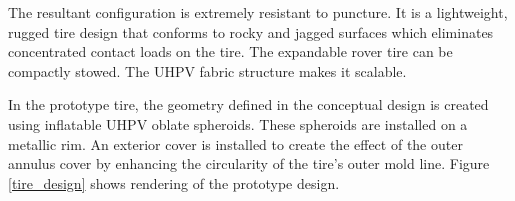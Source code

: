 \documentclass{article}
\begin{document}
The resultant configuration is extremely resistant to puncture. It is a lightweight, rugged tire design that conforms to rocky and jagged surfaces which eliminates concentrated contact loads on the tire. The expandable rover tire can be compactly stowed. The UHPV fabric structure makes it scalable. 

In the prototype tire, the geometry defined in the conceptual design is created using inflatable UHPV oblate spheroids. These spheroids are installed on a metallic rim. An exterior cover is installed to create the effect of the outer annulus cover by enhancing the circularity of the tire's outer mold line. Figure \ref{tire_design} shows rendering of the prototype design.   

\begin{figure}[hbt!]
    \centering
    \begin{minipage}{0.32\textwidth}
        \centering
    \end{minipage}
    \begin{minipage}{0.32\textwidth}
        \centering

\end{minipage}
\end{figure}
\end{document}
